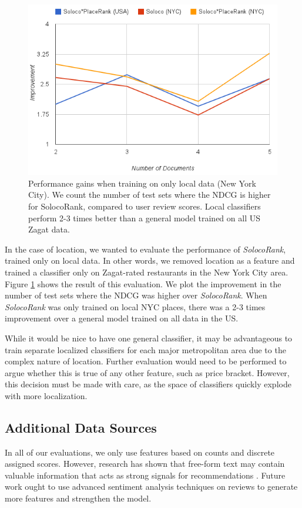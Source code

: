 \begin{figure}[h]
  \includegraphics[width=.5\textwidth]{fig/localclassifier.png}
  \caption{Performance gains when training on only local data (New York City). 
  We count the number of test sets where the NDCG is higher for SolocoRank, compared
  to user review scores.
  Local classifiers perform 2-3 times better than a general model trained on all
  US Zagat data.}
  \label{fig:localclassifier}
\end{figure}

In the case of location, we wanted to evaluate the performance of \emph{SolocoRank},
trained only on local data. In other words, we removed location as a feature
and trained a classifier only on Zagat-rated restaurants in the New York City area.
Figure \ref{fig:localclassifier} shows the result of this evaluation.
We plot the improvement in the number of test sets where the NDCG was higher over \emph{SolocoRank}.
When \emph{SolocoRank} was only trained on local NYC places, 
there was a 2-3 times improvement over a general model trained on
all data in the US.

While it would be nice to have one general classifier,
it may be advantageous to train separate localized classifiers for each 
major metropolitan area due to the complex nature of location.
Further evaluation would need to be performed to argue whether
this is true of any other feature, such as price bracket.
However, this decision must be made with care, as the space of
classifiers quickly explode with more localization.

\subsection{Additional Data Sources}
In all of our evaluations, we only use features based on counts and
discrete assigned scores.
However, research has shown that free-form text may contain
valuable information that acts as strong signals for recommendations \cite{ganu2009}.
Future work ought to use advanced sentiment analysis techniques on reviews
to generate more features and strengthen the model.

